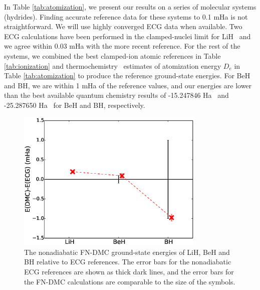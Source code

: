 In Table \ref{tab:atomization}, we present our results on a series of molecular systems (hydrides). Finding accurate reference data for these systems to 0.1 mHa is not straightforward. We will use highly converged ECG data when available. Two ECG calculations have been performed in the clamped-nuclei limit for LiH~\cite{Cencek_LiH,Adamowicz_LiH} and we agree within 0.03 mHa with the more recent reference. For the rest of the systems, we combined the best clamped-ion atomic references in Table \ref{tab:ionization} and thermochemistry~\cite{Feller_Corrections} estimates of atomization energy $D_e$ in Table \ref{tab:atomization} to produce the reference ground-state energies. For BeH and BH, we are within 1 mHa of the reference values, and our energies are lower than the best available quantum chemistry results of -15.247846 Ha~\cite{Koput_BeH} and -25.287650 Ha~\cite{Miliordos_BH} for BeH and BH, respectively. 

\begin{figure}[h]
\centering
\includegraphics[width=0.8\textwidth]{dia-ECG}
\caption{The nonadiabatic FN-DMC ground-state energies of LiH, BeH and BH relative to ECG references. The error bars for the nonadiabatic ECG references are shown as thick dark lines, and the error bars for the FN-DMC calculations are comparable to the size of the symbols. \label{fig:dia-ECG}}
\end{figure}

